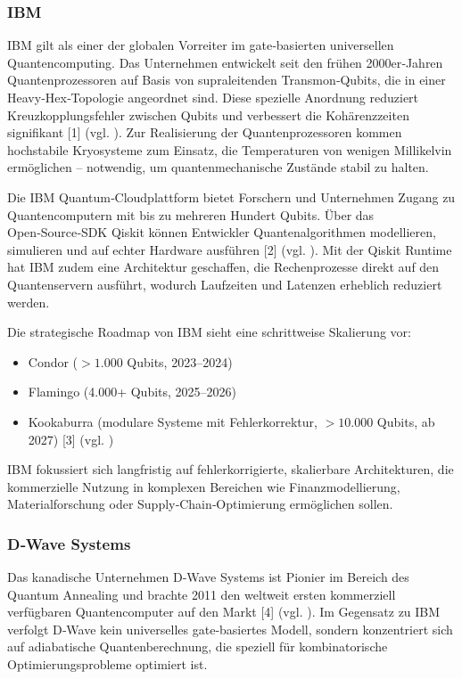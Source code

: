 \subsubsection*{IBM}
IBM gilt als einer der globalen Vorreiter im gate‑basierten universellen Quantencomputing.
Das Unternehmen entwickelt seit den frühen 2000er‑Jahren Quantenprozessoren auf Basis von supraleitenden Transmon‑Qubits, die in einer Heavy‑Hex‑Topologie angeordnet sind.
Diese spezielle Anordnung reduziert Kreuzkopplungsfehler zwischen Qubits und verbessert die Kohärenzzeiten signifikant [1] (vgl. \cite{brandhofer_benchmarking_2022}).
Zur Realisierung der Quantenprozessoren kommen hochstabile Kryosysteme zum Einsatz, die Temperaturen von wenigen Millikelvin ermöglichen – notwendig, um quantenmechanische Zustände stabil zu halten.

Die IBM Quantum‑Cloudplattform bietet Forschern und Unternehmen Zugang zu Quantencomputern mit bis zu mehreren Hundert Qubits.
Über das Open‑Source‑SDK Qiskit können Entwickler Quantenalgorithmen modellieren, simulieren und auf echter Hardware ausführen [2] (vgl. \cite{brandhofer_benchmarking_20220}).
Mit der Qiskit Runtime hat IBM zudem eine Architektur geschaffen, die Rechenprozesse direkt auf den Quantenservern ausführt, wodurch Laufzeiten und Latenzen erheblich reduziert werden.

Die strategische Roadmap von IBM sieht eine schrittweise Skalierung vor:
\begin{itemize}
\item Condor ($>1.000$ Qubits, 2023–2024)
\item Flamingo (4.000+ Qubits, 2025–2026)
\item Kookaburra (modulare Systeme mit Fehlerkorrektur, $>10.000$ Qubits, ab 2027) [3] (vgl. \cite{brandhofer_benchmarking_20220})
\end{itemize}
IBM fokussiert sich langfristig auf fehlerkorrigierte, skalierbare Architekturen, die kommerzielle Nutzung in komplexen Bereichen wie Finanzmodellierung, Materialforschung oder Supply‑Chain‑Optimierung ermöglichen sollen.

\subsubsection*{D‑Wave Systems}
Das kanadische Unternehmen D‑Wave Systems ist Pionier im Bereich des Quantum Annealing und brachte 2011 den weltweit ersten kommerziell verfügbaren Quantencomputer auf den Markt [4] (vgl. \cite{brandhofer_benchmarking_20220}).
Im Gegensatz zu IBM verfolgt D‑Wave kein universelles gate‑basiertes Modell, sondern konzentriert sich auf adiabatische Quantenberechnung, die speziell für kombinatorische Optimierungsprobleme optimiert ist.

